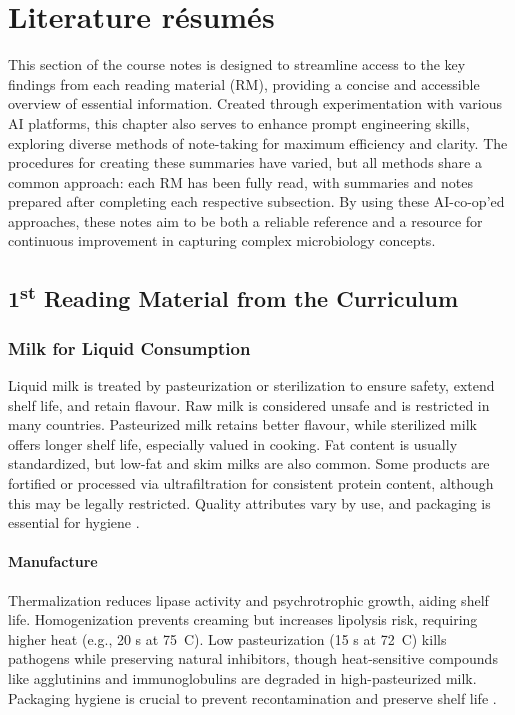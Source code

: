 \chapter{Literature résumés}
\setlength{\headheight}{12.71342pt}
\addtolength{\topmargin}{-0.71342pt}

This section of the course notes is designed to streamline access to the key findings from each reading material (RM), providing a concise and accessible overview of essential information. Created through experimentation with various AI platforms, this chapter also serves to enhance prompt engineering skills, exploring diverse methods of note-taking for maximum efficiency and clarity. The procedures for creating these summaries have varied, but all methods share a common approach: each RM has been fully read, with summaries and notes prepared after completing each respective subsection. By using these AI-co-op'ed approaches, these notes aim to be both a reliable reference and a resource for continuous improvement in capturing complex microbiology concepts.

\section{1\texorpdfstring{\textsuperscript{st}}{st} Reading Material from the Curriculum}

\subsection{Milk for Liquid Consumption}
Liquid milk is treated by pasteurization or sterilization to ensure safety, extend shelf life, and retain flavour. Raw milk is considered unsafe and is restricted in many countries. Pasteurized milk retains better flavour, while sterilized milk offers longer shelf life, especially valued in cooking. Fat content is usually standardized, but low-fat and skim milks are also common. Some products are fortified or processed via ultrafiltration for consistent protein content, although this may be legally restricted. Quality attributes vary by use, and packaging is essential for hygiene \cite*{curr_rm_01_dairy_science_technology}.

\subsubsection*{Manufacture}
Thermalization reduces lipase activity and psychrotrophic growth, aiding shelf life. Homogenization prevents creaming but increases lipolysis risk, requiring higher heat (e.g., 20 s at 75~\textdegree C). Low pasteurization (15 s at 72~\textdegree C) kills pathogens while preserving natural inhibitors, though heat-sensitive compounds like agglutinins and immunoglobulins are degraded in high-pasteurized milk. Packaging hygiene is crucial to prevent recontamination and preserve shelf life \cite*{curr_rm_01_dairy_science_technology}.



